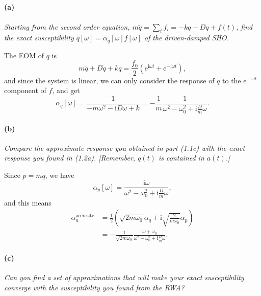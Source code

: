 \documentclass[hyperref, a4paper]{article}
\newcommand*{\ii}{\mathrm{i}}
\newcommand*{\ee}{\mathrm{e}}
\begin{document}
\subsection{}

\paragraph*{(a)}  \textit{
 Starting from the second order equation, $m \ddot{q}=\sum_i f_i=-k q-D \dot{q}+f(t)$, find the exact susceptibility $q[\omega]=\alpha_q[\omega] f[\omega]$ of the driven-damped SHO.   
}

The EOM of $q$ is 
\begin{equation}
    m \ddot{q} + D \dot{q} + k q = \frac{f_0}{2} (\ee^{\ii \omega t} + \ee^{- \ii \omega t}), 
\end{equation}
and since the system is linear, we can only consider 
the response of $q$ to the $\ee^{- \ii \omega t}$ component of $f$, 
and get 
\begin{equation}
    \alpha_q[\omega] = \frac{1}{- m \omega^2 - \ii D \omega + k} 
    = - \frac{1}{m} \frac{1}{\omega^2 - \omega_0^2 + \ii \frac{D}{m} \omega}.
\end{equation}

\paragraph*{(b)} \textit{Compare the approximate response you obtained in part (1.1c) with the exact response you found in (1.2a). [Remember, $q(t)$ is contained in $a(t)$.]} 

Since $p = m \dot{q}$, we have 
\begin{equation}
    \alpha_p[\omega] = \frac{\ii \omega}{\omega^2 - \omega_0^2 + \ii \frac{D}{m} \omega},
\end{equation}
and this means 
\begin{equation}
    \begin{aligned}
        \alpha_a^{\text{accurate}} &= \frac{1}{2} 
        \left(
            \sqrt{2 m \omega_0} \alpha_q + \ii \sqrt{\frac{2}{m \omega_0}} \alpha_p
        \right) \\
        &= - \frac{1}{\sqrt{2 m \omega_0}} \frac{\omega + \omega_0}{\omega^2 - \omega_0^2 + \ii \frac{D}{m} \omega}.
    \end{aligned}
\end{equation}

\paragraph*{(c)} \textit{Can you find a set of approximations that will make your exact susceptibility converge with the susceptibility you found from the RWA?} 
\end{document}
